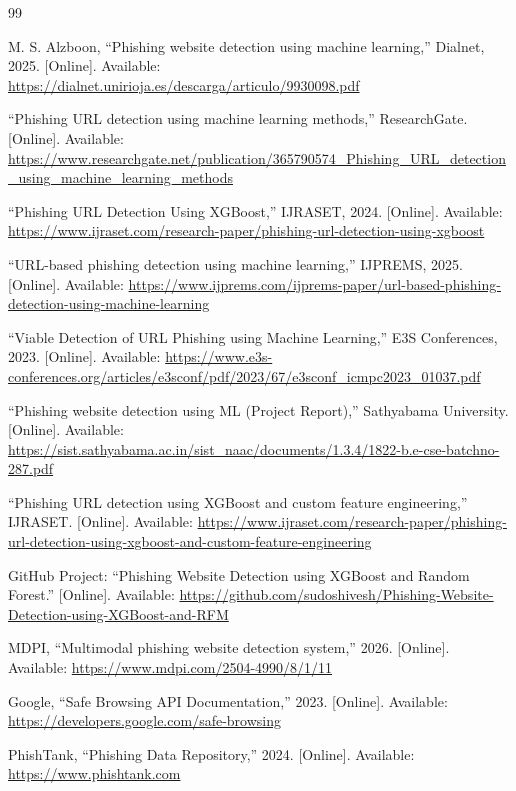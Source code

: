 \begin{thebibliography}{99}

M. S. Alzboon, “Phishing website detection using machine learning,” Dialnet, 2025. [Online]. Available: \url{https://dialnet.unirioja.es/descarga/articulo/9930098.pdf}

“Phishing URL detection using machine learning methods,” ResearchGate. [Online]. Available: \url{https://www.researchgate.net/publication/365790574_Phishing_URL_detection_using_machine_learning_methods}

“Phishing URL Detection Using XGBoost,” IJRASET, 2024. [Online]. Available: \url{https://www.ijraset.com/research-paper/phishing-url-detection-using-xgboost}

“URL-based phishing detection using machine learning,” IJPREMS, 2025. [Online]. Available: \url{https://www.ijprems.com/ijprems-paper/url-based-phishing-detection-using-machine-learning}

“Viable Detection of URL Phishing using Machine Learning,” E3S Conferences, 2023. [Online]. Available: \url{https://www.e3s-conferences.org/articles/e3sconf/pdf/2023/67/e3sconf_icmpc2023_01037.pdf}

“Phishing website detection using ML (Project Report),” Sathyabama University. [Online]. Available: \url{https://sist.sathyabama.ac.in/sist_naac/documents/1.3.4/1822-b.e-cse-batchno-287.pdf}

“Phishing URL detection using XGBoost and custom feature engineering,” IJRASET. [Online]. Available: \url{https://www.ijraset.com/research-paper/phishing-url-detection-using-xgboost-and-custom-feature-engineering}

GitHub Project: “Phishing Website Detection using XGBoost and Random Forest.” [Online]. Available: \url{https://github.com/sudoshivesh/Phishing-Website-Detection-using-XGBoost-and-RFM}

MDPI, “Multimodal phishing website detection system,” 2026. [Online]. Available: \url{https://www.mdpi.com/2504-4990/8/1/11}

Google, “Safe Browsing API Documentation,” 2023. [Online]. Available: \url{https://developers.google.com/safe-browsing}

PhishTank, “Phishing Data Repository,” 2024. [Online]. Available: \url{https://www.phishtank.com}


\end{thebibliography}
